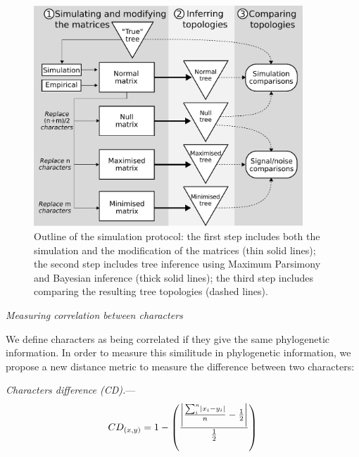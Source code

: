 \documentclass[12pt,letterpaper]{article}
\DeclarePairedDelimiter\abs{\lvert}{\rvert}%
\renewcommand{\subsection}[1]{%
\bigskip
\begin{center}
\begin{large}
\normalfont\itshape #1
\end{large}
\end{center}}
\renewcommand{\subsubsection}[1]{%
\vspace{2ex}
\noindent
\textit{#1.}---}
\begin{document}
\begin{figure}[!htbp]
\centering
   \includegraphics[width=0.9\textwidth]{Figures/outline.pdf}
\caption{Outline of the simulation protocol: the first step includes both the simulation and the modification of the matrices (thin solid lines); the second step includes tree inference using Maximum Parsimony and Bayesian inference (thick solid lines); the third step includes comparing the resulting tree topologies (dashed lines).}
\label{Fig:outline}
\end{figure}


\subsection{Measuring correlation between characters}
We define characters as being correlated if they give the same phylogenetic information.
In order to measure this similitude in phylogenetic information, we propose a new distance metric to measure the difference between two characters:

\subsubsection{Characters difference (CD)}
\begin{equation}
    CD_{(x,y)} = 1 - \left(\frac{\abs*{\frac{\sum_{i}^{n}\abs{x_{i} - y_{i}}}{n}-\frac{1}{2}}}{\frac{1}{2}}\right)
\end{equation}
\end{document}
